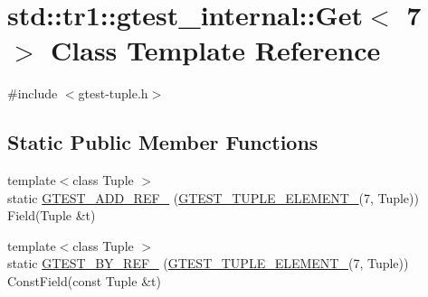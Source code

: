 \hypertarget{classstd_1_1tr1_1_1gtest__internal_1_1_get_3_017_01_4}{\section{std\+:\+:tr1\+:\+:gtest\+\_\+internal\+:\+:Get$<$ 7 $>$ Class Template Reference}
\label{classstd_1_1tr1_1_1gtest__internal_1_1_get_3_017_01_4}
}


{\ttfamily \#include $<$gtest-\/tuple.\+h$>$}

\subsection*{Static Public Member Functions}
\begin{DoxyCompactItemize}
\item 
{\footnotesize template$<$class Tuple $>$ }\\static \hyperlink{classstd_1_1tr1_1_1gtest__internal_1_1_get_3_017_01_4_ae1245f00b2ad610a130681b5bc81051c}{G\+T\+E\+S\+T\+\_\+\+A\+D\+D\+\_\+\+R\+E\+F\+\_\+} (\hyperlink{gtest-tuple_8h_a1b7f133d8aa02e0b7afed7b66781eeb7}{G\+T\+E\+S\+T\+\_\+\+T\+U\+P\+L\+E\+\_\+\+E\+L\+E\+M\+E\+N\+T\+\_\+}(7, Tuple)) Field(Tuple \&t)
\item 
{\footnotesize template$<$class Tuple $>$ }\\static \hyperlink{classstd_1_1tr1_1_1gtest__internal_1_1_get_3_017_01_4_afb7bd56e0697304325cd157d11df4a7b}{G\+T\+E\+S\+T\+\_\+\+B\+Y\+\_\+\+R\+E\+F\+\_\+} (\hyperlink{gtest-tuple_8h_a1b7f133d8aa02e0b7afed7b66781eeb7}{G\+T\+E\+S\+T\+\_\+\+T\+U\+P\+L\+E\+\_\+\+E\+L\+E\+M\+E\+N\+T\+\_\+}(7, Tuple)) Const\+Field(const Tuple \&t)
\end{DoxyCompactItemize}


